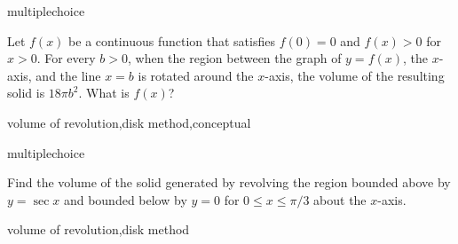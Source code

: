 \documentclass{ximera}
\begin{document}
\begin{question}[2016C.14]
\begin{type}
multiplechoice
\end{type}
Let \(f(x)\) be a continuous function that satisfies \(f(0) = 0\) and \(f(x) > 0\) for \(x > 0\). For every \(b > 0\), when the region between the graph of \(y = f(x)\), the \(x\)-axis, and the line \(x=b\) is rotated around the \(x\)-axis, the volume of the resulting solid is \(18 \pi b^2\). What is \(f(x)\)?
\begin{multiplechoice}
\end{multiplechoice}
\begin{keywords}
volume of revolution,disk method,conceptual
\end{keywords}
\end{question}

\begin{question}[2017C.02]
\begin{type}
multiplechoice
\end{type}
Find the volume of the solid generated by revolving the region bounded above by \(y = \sec x\) and bounded below by \(y=0\) for \(0 \leq x \leq \pi/3\) about the \(x\)-axis.
\begin{multiplechoice}
\choice{\(\pi\)}
\choice{\(2 \pi\)}
\choice{\(3 \pi\)}
\choice{\(4 \pi\)}
\end{multiplechoice}
\begin{keywords}
volume of revolution,disk method
\end{keywords}
\end{question}
\end{document}
